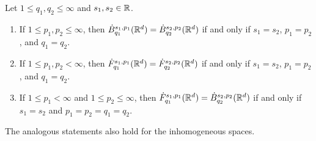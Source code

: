 \begin{proposition}
	Let $1 \leq q_1, q_2 \leq \infty$ and $s_1, s_2 \in \mathbb R$. 
	\begin{enumerate}
		\item If $1 \leq p_1, p_2 \leq \infty$, then $\dot B^{s_1, p_1}_{q_1} (\mathbb R^d) = \dot B^{s_2, p_2}_{q_2} (\mathbb R^d)$ if and only if $s_1 = s_2$, $p_1 = p_2$, and $q_1 = q_2$. 
		
		\item If $1 \leq p_1, p_2 < \infty$, then $\dot F^{s_1, p_1}_{q_1} (\mathbb R^d) = \dot F^{s_2, p_2}_{q_2} (\mathbb R^d)$ if and only if $s_1 = s_2$, $p_1 = p_2$, and $q_1 = q_2$. 
		
		\item If $1 \leq p_1 < \infty$ and $1 \leq p_2 \leq \infty$, then $\dot F^{s_1, p_1}_{q_1} (\mathbb R^d) = \dot B^{s_2, p_2}_{q_2} (\mathbb R^d)$ if and only if $s_1 = s_2$ and $p_1 = p_2 = q_1 = q_2$. 
	\end{enumerate}
	The analogous statements also hold for the inhomogeneous spaces. 
\end{proposition}
